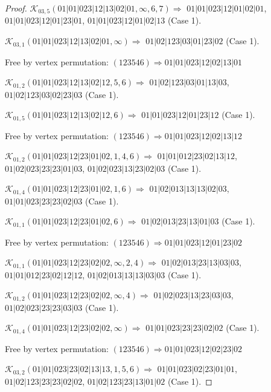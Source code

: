 \documentclass[12pt]{article}
\theoremstyle{plain}
\theoremstyle{definition}
\theoremstyle{remark}
\newcommand{\fancy}[1]{\mathcal{#1}}
\def\K{\fancy{K}}
\begin{document}
\begin{proof}
	$\K_{03,5}(01|01|023|12|13|02|01,\infty,6, 7)\Rightarrow $ $01|01|023|12|01|02|01$, $01|01|023|12|01|23|01$, $01|01|023|12|01|02|13$ (Case 1).
	
	$\K_{03,1}(01|01|023|12|13|02|01,\infty)\Rightarrow $ $01|02|123|03|01|23|02$ (Case 1).
	
	
	
	Free by vertex permutation: $(1 2 3 5 4 6)\Rightarrow 01|01|023|12|02|13|01$
	
	
	
	\bigskip
	
	$\K_{01,2}(01|01|023|12|13|02|12,5, 6)\Rightarrow $ $01|02|123|03|01|13|03$, $01|02|123|03|02|23|03$ (Case 1).
	
	$\K_{01,5}(01|01|023|12|13|02|12,6)\Rightarrow $ $01|01|023|12|01|23|12$ (Case 1).
	
	
	
	Free by vertex permutation: $(1 2 3 5 4 6)\Rightarrow 01|01|023|12|02|13|12$
	
	
	
	\bigskip
	
	$\K_{01,2}(01|01|023|12|23|01|02,1, 4, 6)\Rightarrow $ $01|01|012|23|02|13|12$, $01|02|023|23|23|01|03$, $01|02|023|13|23|02|03$ (Case 1).
	
	$\K_{01,4}(01|01|023|12|23|01|02,1, 6)\Rightarrow $ $01|02|013|13|13|02|03$, $01|01|023|23|23|02|03$ (Case 1).
	
	$\K_{01,1}(01|01|023|12|23|01|02,6)\Rightarrow $ $01|02|013|23|13|01|03$ (Case 1).
	
	
	
	Free by vertex permutation: $(1 2 3 5 4 6)\Rightarrow 01|01|023|12|01|23|02$
	
	
	
	\bigskip
	
	$\K_{01,1}(01|01|023|12|23|02|02,\infty,2, 4)\Rightarrow $ $01|02|013|23|13|03|03$, $01|01|012|23|02|12|12$, $01|02|013|13|13|03|03$ (Case 1).
	
	$\K_{01,2}(01|01|023|12|23|02|02,\infty,4)\Rightarrow $ $01|02|023|13|23|03|03$, $01|02|023|23|23|03|03$ (Case 1).
	
	$\K_{01,4}(01|01|023|12|23|02|02,\infty)\Rightarrow $ $01|01|023|23|23|02|02$ (Case 1).
	
	
	
	Free by vertex permutation: $(1 2 3 5 4 6)\Rightarrow 01|01|023|12|02|23|02$
	
	
	
	\bigskip
	
	$\K_{03,2}(01|01|023|23|02|13|13,1, 5, 6)\Rightarrow $ $01|01|023|02|23|01|01$, $01|02|123|23|23|02|02$, $01|02|123|23|13|01|02$ (Case 1).
	

\end{proof}
\end{document}

